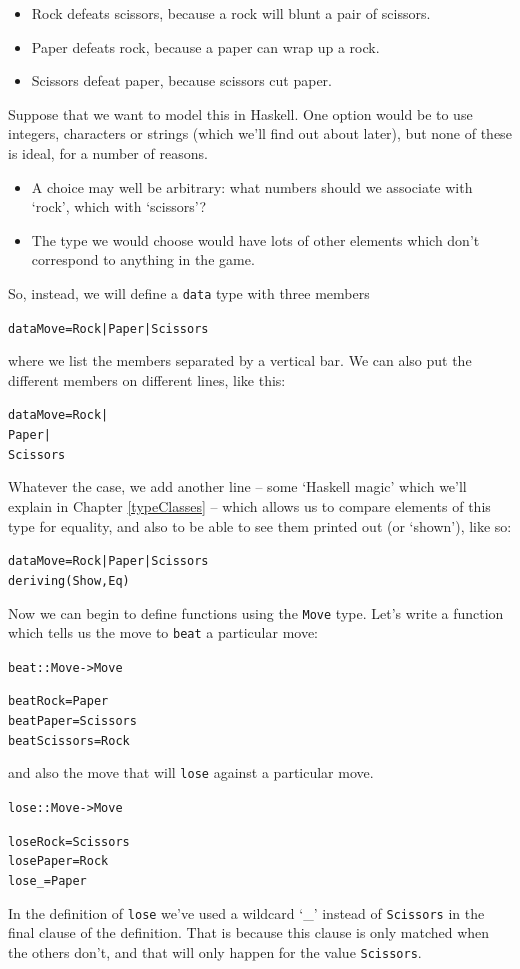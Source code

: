 \begin{itemize}
\item Rock defeats scissors, because a rock will blunt a pair of scissors.
\item Paper defeats rock, because a paper can wrap up a rock.
\item Scissors defeat paper, because scissors cut paper.
\end{itemize}
Suppose that we want to model this in Haskell. One option would be to use integers, characters or strings (which we'll find out about later), but none of these is ideal, for a number of reasons.
\begin{itemize}
\item
A choice may well be arbitrary: what numbers should we associate with `rock', which with `scissors'?
\item
The type we would choose would have lots of other elements which don't correspond to anything in the game.
\end{itemize} 
So, instead, we will define a \texttt{data} type with three members  
\begin{alltt}
data Move = Rock | Paper | Scissors
\end{alltt}
where we list the members separated by a vertical bar. We can also put the different members on different lines, like this:
\begin{alltt}
data Move = Rock | 
            Paper | 
            Scissors
\end{alltt}
Whatever the case, we add another line -- some `Haskell magic' which we'll explain in Chapter \ref{typeClasses} -- which allows us to compare elements of this type for equality, and also to be able to see them printed out (or `shown'), like so:
\begin{alltt}
data Move = Rock | Paper | Scissors
            deriving (Show,Eq)
\end{alltt}
Now we can begin to define functions using the \texttt{Move} type.
Let's write a function which tells us the move to \texttt{beat} a particular move:
\begin{alltt}
beat :: Move -> Move

beat Rock     = Paper
beat Paper    = Scissors
beat Scissors = Rock
\end{alltt}
and also the move that will \texttt{lose} against a particular move.
\begin{alltt}
lose :: Move -> Move

lose Rock  = Scissors
lose Paper = Rock
lose _     = Paper
\end{alltt}
In the definition of \texttt{lose} we've used a wildcard `\_' instead of \texttt{Scissors} in the final clause of the definition. That is because this clause is only matched when the others don't, and that will only happen for the value \texttt{Scissors}.

